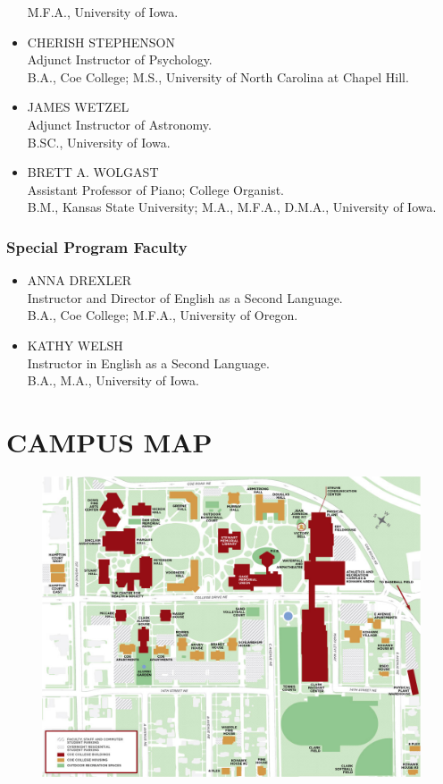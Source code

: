 \documentclass[
  letterpaper,
]{scrbook}
\begin{document}
\begin{itemize}
  M.F.A., University of Iowa.
\item
  CHERISH STEPHENSON\\
  Adjunct Instructor of Psychology.\\
  B.A., Coe College; M.S., University of North Carolina at Chapel Hill.
\item
  JAMES WETZEL\\
  Adjunct Instructor of Astronomy.\\
  B.SC., University of Iowa.
\item
  BRETT A. WOLGAST\\
  Assistant Professor of Piano; College Organist.\\
  B.M., Kansas State University; M.A., M.F.A., D.M.A., University of
  Iowa.
\end{itemize}

\hypertarget{special-program-faculty}{%
\subsection{Special Program Faculty}\label{special-program-faculty}}

\begin{itemize}
\item
  ANNA DREXLER\\
  Instructor and Director of English as a Second Language.\\
  B.A., Coe College; M.F.A., University of Oregon.
\item
  KATHY WELSH\\
  Instructor in English as a Second Language.\\
  B.A., M.A., University of Iowa.
\end{itemize}

\hypertarget{sec-campus-map}{%
\chapter{CAMPUS MAP}\label{sec-campus-map}}

\begin{figure}

{\centering \includegraphics{catalog_sections/graphics/Campus-Map_full-screen.jpg}

}

\end{figure}

\backmatter
\printindex
\end{document}
